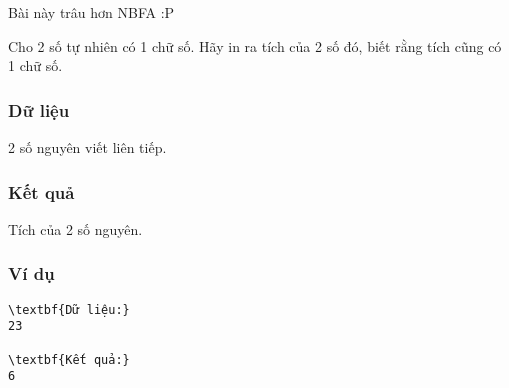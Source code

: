 



   Bài này trâu hơn NBFA :P  

   Cho 2 số tự nhiên có 1 chữ số. Hãy in ra tích của 2 số đó, biết rằng tích cũng có 1 chữ số.  

\subsubsection{   Dữ liệu  }

   2 số nguyên viết liên tiếp.  

\subsubsection{   Kết quả  }

   Tích của 2 số nguyên.  

\subsubsection{   Ví dụ  }
\begin{verbatim}
\textbf{Dữ liệu:}
23

\textbf{Kết quả:}
6
\end{verbatim}